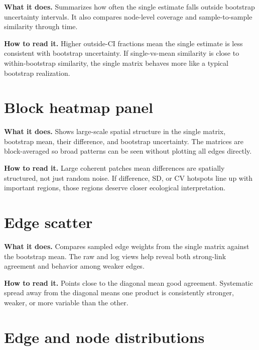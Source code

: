 \documentclass[11pt,a4paper]{article}
\begin{document}
\textbf{What it does.} Summarizes how often the single estimate falls outside bootstrap uncertainty intervals.
It also compares node-level coverage and sample-to-sample similarity through time.


\textbf{How to read it.} Higher outside-CI fractions mean the single estimate is less consistent with bootstrap uncertainty.
If single-vs-mean similarity is close to within-bootstrap similarity, the single matrix behaves more like a typical bootstrap realization.

\section{Block heatmap panel}

\textbf{What it does.} Shows large-scale spatial structure in the single matrix, bootstrap mean, their difference, and bootstrap uncertainty.
The matrices are block-averaged so broad patterns can be seen without plotting all edges directly.


\textbf{How to read it.} Large coherent patches mean differences are spatially structured, not just random noise.
If difference, SD, or CV hotspots line up with important regions, those regions deserve closer ecological interpretation.

\section{Edge scatter}

\textbf{What it does.} Compares sampled edge weights from the single matrix against the bootstrap mean.
The raw and log views help reveal both strong-link agreement and behavior among weaker edges.


\textbf{How to read it.} Points close to the diagonal mean good agreement.
Systematic spread away from the diagonal means one product is consistently stronger, weaker, or more variable than the other.

\section{Edge and node distributions}
\end{document}
